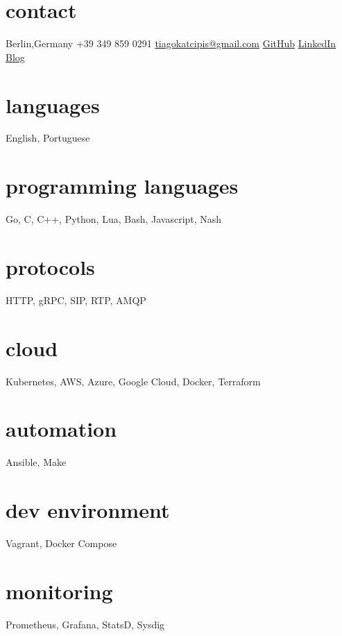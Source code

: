 \documentclass[]{friggeri-cv} %
\begin{document}


\begin{aside} %
\section{contact}
Berlin,Germany
+39 349 859 0291
\href{mailto:tiagokatcipis@gmail.com}{tiagokatcipis@gmail.com}
\href{https://github.com/katcipis}{GitHub}
\href{http://www.linkedin.com/pub/tiago-katcipis/1b/273/8b0}{LinkedIn}
\href{http://katcipis.github.io/}{Blog}
\section{languages}
English, Portuguese
\section{programming languages}
Go, C, C++, Python, Lua, Bash, Javascript, Nash
\section{protocols}
HTTP, gRPC, SIP, RTP, AMQP
\section{cloud}
Kubernetes, AWS, Azure, Google Cloud, Docker, Terraform
\section{automation}
Ansible, Make
\section{dev environment}
Vagrant, Docker Compose
\section{monitoring}
Prometheus, Grafana, StatsD, Sysdig
\end{aside}

\end{document}
